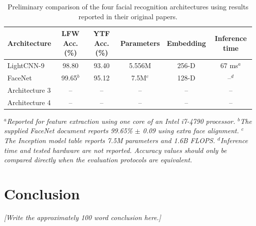 \documentclass[11pt,a4paper,twocolumn]{article}
\begin{document}
\begin{table}[t]
    \centering
    \caption{Preliminary comparison of the four facial recognition architectures using results reported in their original papers.}
    \label{tab:architecture_comparison}
    \begin{tabular}{lccccc}
        \toprule
        \textbf{Architecture} & \textbf{LFW Acc. (\%)} & \textbf{YTF Acc. (\%)} & \textbf{Parameters} & \textbf{Embedding} & \textbf{Inference time} \\
        \midrule
        LightCNN-9 & 98.80 & 93.40 & 5.556M & 256-D & 67 ms$^{a}$ \\
        FaceNet & 99.65$^{b}$ & 95.12 & 7.5M$^{c}$ & 128-D & --$^{d}$ \\
        Architecture 3 & -- & -- & -- & -- & -- \\
        Architecture 4 & -- & -- & -- & -- & -- \\
        \bottomrule
    \end{tabular}

    \vspace{2pt}
    \begin{minipage}{0.96\textwidth}
        \footnotesize\textit{$^{a}$Reported for feature extraction using one core of an Intel i7-4790 processor. $^{b}$The supplied FaceNet document reports 99.65\% $\pm$ 0.09 using extra face alignment. $^{c}$The Inception model table reports 7.5M parameters and 1.6B FLOPS. $^{d}$Inference time and tested hardware are not reported. Accuracy values should only be compared directly when the evaluation protocols are equivalent.}
    \end{minipage}
\end{table}



\section{Conclusion}

\textit{[Write the approximately 100 word conclusion here.]}


\end{document}
